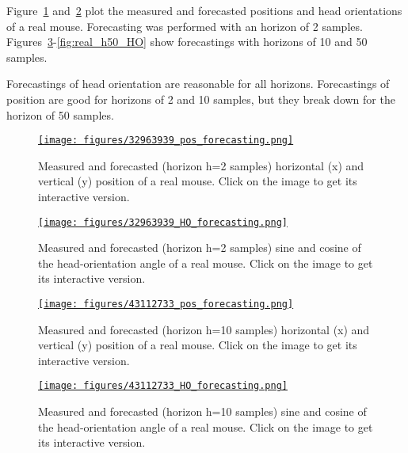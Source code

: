 \documentclass[12pt]{article}
\begin{document}
Figure~\ref{fig:real_h2_pos} and~\ref{fig:real_h2_HO} plot the measured and
forecasted positions and head orientations of a real mouse. Forecasting was
performed with an horizon of 2 samples.
%
Figures~\ref{fig:real_h10_pos}-\ref{fig:real_h50_HO} show forecastings with
horizons of 10 and 50 samples.

Forecastings of head orientation are reasonable for all horizons. Forecastings
of position are good for horizons of 2 and 10 samples, but they break down for
the horizon of 50 samples.

\begin{figure}
    \centering
    \href{https://www.gatsby.ucl.ac.uk/~rapela/aman/reports/ekfForKinematicsAndHeadOrientation/figures/32963939_pos_forecasting.html}{\texttt{[image: figures/32963939\_pos\_forecasting.png]}}
    \caption{Measured and forecasted (horizon h=2 samples) horizontal (x) and
    vertical (y) position of a real mouse. Click on the image to get its
    interactive version.}
    \label{fig:real_h2_pos}
\end{figure}

\begin{figure}
    \centering
    \href{https://www.gatsby.ucl.ac.uk/~rapela/aman/reports/ekfForKinematicsAndHeadOrientation/figures/32963939_HO_forecasting.html}{\texttt{[image: figures/32963939\_HO\_forecasting.png]}}
    \caption{Measured and forecasted (horizon h=2 samples) sine and cosine of
    the head-orientation angle of a real mouse. Click on the image to get
    its interactive version.}
    \label{fig:real_h2_HO}
\end{figure}

\begin{figure}
    \centering
    \href{https://www.gatsby.ucl.ac.uk/~rapela/aman/reports/ekfForKinematicsAndHeadOrientation/figures/43112733_pos_forecasting.html}{\texttt{[image: figures/43112733\_pos\_forecasting.png]}}
    \caption{Measured and forecasted (horizon h=10 samples) horizontal (x) and
    vertical (y) position of a real mouse. Click on the image to get its
    interactive version.}
    \label{fig:real_h10_pos}
\end{figure}

\begin{figure}
    \centering
    \href{https://www.gatsby.ucl.ac.uk/~rapela/aman/reports/ekfForKinematicsAndHeadOrientation/figures/43112733_HO_forecasting.html}{\texttt{[image: figures/43112733\_HO\_forecasting.png]}}
    \caption{Measured and forecasted (horizon h=10 samples) sine and cosine of
    the head-orientation angle of a real mouse. Click on the image to get
    its interactive version.}
    \label{fig:real_h10_HO}
\end{figure}
\end{document}
